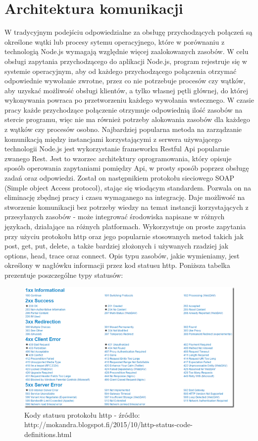 \documentclass[12pt]{report}
\begin{document}
\section{Architektura komunikacji}
W tradycyjnym podejściu odpowiedzialne za obsługę przychodzących połączeń są określone wątki lub procesy sytemu operacyjnego, które w porównaniu z technologią Node.js wymagają względnie więcej zaalokowanych zasobów. 
W celu obsługi zapytania przychodzącego do aplikacji Node.js, program rejestruje się w systemie operacyjnym, aby od każdego przychodzącego połączenia otrzymać odpowiednie wywołanie zwrotne, przez co nie potrzebuje procesów czy wątków, aby uzyskać możliwość obsługi klientów, a tylko własnej pętli głównej, do której wykonywania powraca po przetworzeniu każdego wywołania wstecznego. 
W czasie pracy każde przychodzące połączenie otrzymuje odpowiednią ilość zasobów na stercie programu, więc nie ma również potrzeby alokowania zasobów dla każdego z wątków czy procesów osobno. 
Najbardziej popularna metoda na zarządzanie komunikacją między instancjami korzystającymi z serwera używającego technologii Node.js jest wykorzystanie frameworku Restful Api popularnie zwanego Rest. 
Jest to wzorzec architektury oprogramowania, który opisuje sposób operowania zapytaniami pomiędzy Api, w prosty sposób poprzez obsługę zadań oraz odpowiedzi. 
Został on następnikiem protokołu sieciowego SOAP (Simple object Access protocol), stając się wiodącym standardem. 
Pozwala on na eliminację zbędnej pracy i czasu wymaganego na integrację. 
Daje możliwość na stworzenie komunikacji bez potrzeby wiedzy na temat instancji korzystających z przesyłanych zasobów - może integrować środowiska napisane w różnych językach, działające na różnych platformach. 
Wykorzystuje on proste zapytania przy użyciu protokołu http oraz jego popularnie stosowanych metod takich jak post, get, put, delete, a także bardziej złożonych i używanych rzadziej jak options, head, trace oraz connect. 
Opis typu zasobów, jakie wymieniamy, jest określony w nagłówku informacji przez kod statusu http. 
Poniższa tabelka prezentuje poszczególne typy statusów:
\newpage
\begin{figure}[!hb]
\centering
\includegraphics[width=\textwidth,height=\textheight,keepaspectratio]{statuses.png} 
\caption{Kody statusu protokołu http - źródło: http://mokandra.blogspot.fi/2015/10/http-status-code-definitions.html}
\end{figure}
\end{document}
